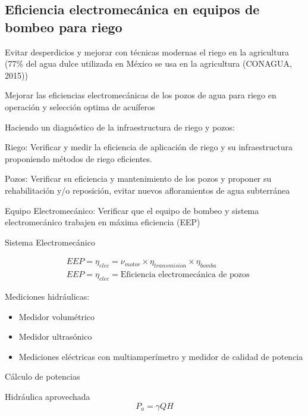 \subsection{Eficiencia electromecánica en equipos de bombeo para riego}
Evitar desperdicios y mejorar con técnicas modernas el riego en la agricultura (77\% del agua dulce utilizada en México se usa en la agricultura (CONAGUA, 2015))

Mejorar las eficiencias electromecánicas de los pozos de agua para riego en operación y selección optima de acuíferos

Haciendo un diagnóstico de la infraestructura de riego y pozos:

Riego: Verificar y medir la eficiencia de aplicación de riego y su infraestructura proponiendo métodos de riego eficientes.

Pozos: Verificar su eficiencia y mantenimiento de los pozos y proponer su rehabilitación y/o reposición, evitar nuevos afloramientos de agua subterránea

Equipo Electromecánico: Verificar que el equipo de bombeo y sistema electromecánico trabajen en máxima eficiencia (EEP)

Sistema Electromecánico

\begin{center}
\end{center}
\begin{align}
    &EEP=\eta_{elec}= \nu_{motor}\times \eta_{transmision}\times \eta_{bomba}\\
    &EEP=\eta_{elec}= \text{Eficiencia electromecánica de pozos}
\end{align}

Mediciones hidráulicas:
\begin{itemize}
    \item Medidor volumétrico
    \item Medidor ultrasónico
    \item Mediciones eléctricas con multiamperímetro y medidor de calidad de potencia
\end{itemize}

Cálculo de potencias

Hidráulica aprovechada
\begin{equation}
    P_a= \gamma QH
\end{equation}

